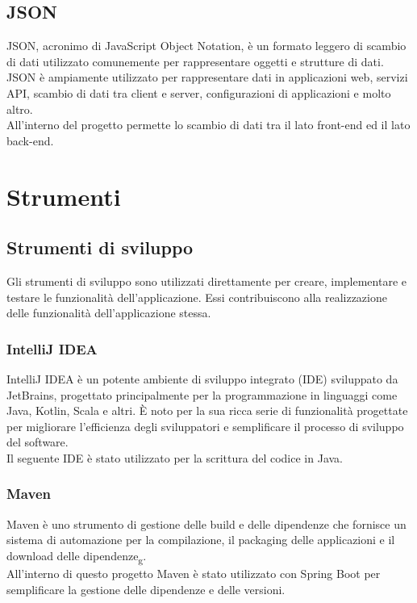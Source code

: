 \subsection*{JSON}
JSON, acronimo di JavaScript Object Notation, è un formato leggero di scambio di dati utilizzato comunemente per rappresentare oggetti e strutture di dati.
JSON è ampiamente utilizzato per rappresentare dati in applicazioni web, servizi API, scambio di dati tra client e server, configurazioni di applicazioni e molto altro.\\
All'interno del progetto permette lo scambio di dati tra il lato front-end ed il lato back-end.
\\

\section{Strumenti}
\subsection{Strumenti di sviluppo}
Gli strumenti di sviluppo sono utilizzati direttamente per creare, implementare e testare le funzionalità dell'applicazione. Essi contribuiscono alla realizzazione delle funzionalità dell'applicazione stessa.\\

\subsubsection*{IntelliJ IDEA}
IntelliJ IDEA è un potente ambiente di sviluppo integrato (IDE) sviluppato da JetBrains, progettato principalmente per la programmazione in linguaggi come Java, Kotlin, Scala e altri.
È noto per la sua ricca serie di funzionalità progettate per migliorare l'efficienza degli sviluppatori e semplificare il processo di sviluppo del software.\\
Il seguente IDE è stato utilizzato per la scrittura del codice in Java.\\

\subsubsection*{Maven}
Maven è uno strumento di gestione delle build e delle dipendenze che fornisce un sistema di automazione per la compilazione, il packaging delle applicazioni e il download delle dipendenze\textsubscript{g}.\\
All'interno di questo progetto Maven è stato utilizzato con Spring Boot per semplificare la gestione delle dipendenze e delle versioni.
\\


